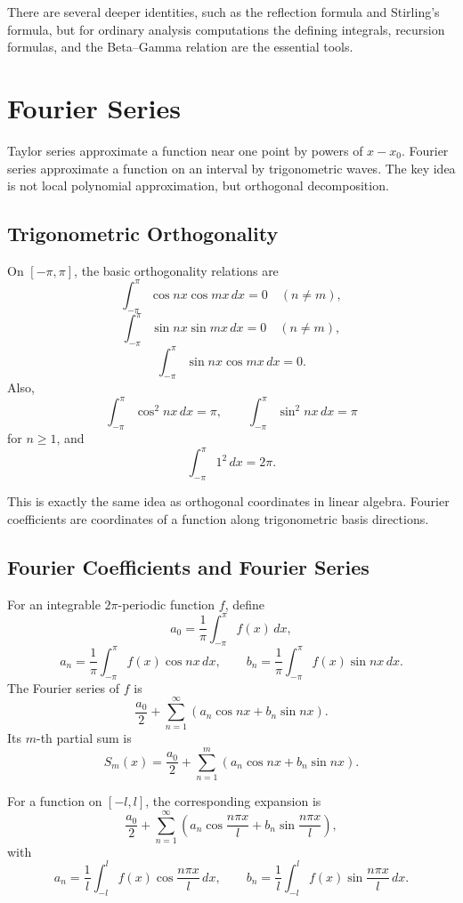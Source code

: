 There are several deeper identities, such as the reflection formula and Stirling's formula, but for ordinary analysis computations the defining integrals, recursion formulas, and the Beta--Gamma relation are the essential tools.

\section{Fourier Series}

Taylor series approximate a function near one point by powers of $x-x_0$. Fourier series approximate a function on an interval by trigonometric waves. The key idea is not local polynomial approximation, but orthogonal decomposition.

\subsection{Trigonometric Orthogonality}

On $[-\pi,\pi]$, the basic orthogonality relations are
\[
    \int_{-\pi}^{\pi}\cos nx\cos mx\,dx=0\quad(n\ne m),
\]
\[
    \int_{-\pi}^{\pi}\sin nx\sin mx\,dx=0\quad(n\ne m),
\]
\[
    \int_{-\pi}^{\pi}\sin nx\cos mx\,dx=0.
\]
Also,
\[
    \int_{-\pi}^{\pi}\cos^2 nx\,dx=\pi,
    \qquad
    \int_{-\pi}^{\pi}\sin^2 nx\,dx=\pi
\]
for $n\ge1$, and
\[
    \int_{-\pi}^{\pi}1^2\,dx=2\pi.
\]

This is exactly the same idea as orthogonal coordinates in linear algebra. Fourier coefficients are coordinates of a function along trigonometric basis directions.

\subsection{Fourier Coefficients and Fourier Series}

For an integrable $2\pi$-periodic function $f$, define
\[
    a_0=\frac1\pi\int_{-\pi}^{\pi}f(x)\,dx,
\]
\[
    a_n=\frac1\pi\int_{-\pi}^{\pi}f(x)\cos nx\,dx,
    \qquad
    b_n=\frac1\pi\int_{-\pi}^{\pi}f(x)\sin nx\,dx.
\]
The Fourier series of $f$ is
\[
    \frac{a_0}{2}+\sum_{n=1}^{\infty}(a_n\cos nx+b_n\sin nx).
\]
Its $m$-th partial sum is
\[
    S_m(x)=\frac{a_0}{2}+\sum_{n=1}^{m}(a_n\cos nx+b_n\sin nx).
\]

For a function on $[-l,l]$, the corresponding expansion is
\[
    \frac{a_0}{2}+\sum_{n=1}^{\infty}
    \left(a_n\cos\frac{n\pi x}{l}+b_n\sin\frac{n\pi x}{l}\right),
\]
with
\[
    a_n=\frac1l\int_{-l}^{l}f(x)\cos\frac{n\pi x}{l}\,dx,
    \qquad
    b_n=\frac1l\int_{-l}^{l}f(x)\sin\frac{n\pi x}{l}\,dx.
\]

